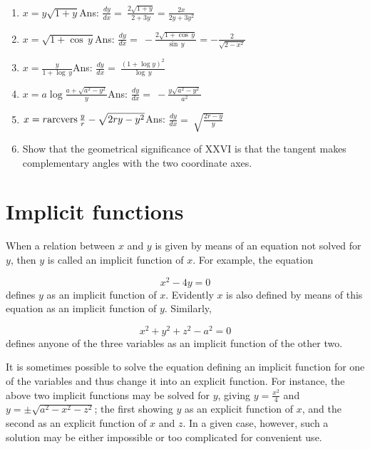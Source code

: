 \begin{enumerate}
\addtocounter{enumi}{43}
\item
$x = y\sqrt{1 + y}$\qquad\qquad\qquad\qquad\qquad\qquad Ans:  	
$\frac{dy}{dx} 	=\ \frac{2\sqrt{1 + y}}{2 + 3y} = \frac{2x}{2y + 3y^2}$

\item
$x = \sqrt{1 + \cos\, y}$\qquad\qquad\qquad\qquad\qquad\qquad Ans:  	
$\frac{dy}{dx} 	=\ -\frac{2 \sqrt{1 + \cos\, y}}{\sin\, y} = -\frac{2}{\sqrt{2 - x^2}}$

\item
$x = \frac{y}{1 + \log\, y}$\qquad\qquad\qquad\qquad\qquad\qquad Ans:  	
$\frac{dy}{dx} 	=\ \frac{(1 + \log y)^2}{\log\, y}$

\item
$x = a \log \frac{a + \sqrt{a^2 - y^2}}{y}$\qquad\qquad\qquad\qquad\qquad\qquad Ans:  
$\frac{dy}{dx} 	=\ -\frac{y \sqrt{a^2 - y^2}}{a^2}$

\item
$x = r {\rm arcvers}\, \frac{y}{r} - \sqrt{2ry - y^2}$\qquad\qquad\qquad\qquad\qquad\qquad Ans:  
$\frac{dy}{dx} 	=\ \sqrt{\frac{2r - y}{y}}$

\item
Show that the geometrical significance of XXVI is 
that the tangent makes complementary angles with the two coordinate axes.


\end{enumerate}

\section{Implicit functions}

When a relation between $x$ and $y$ is given by means of an equation 
not solved for $y$, then $y$ is called an implicit function of $x$. 
For example, the equation

\[
    x^2 - 4y = 0
\]
defines $y$ as an implicit function of $x$. Evidently $x$ is also defined 
by means of this equation as an implicit function of $y$. Similarly,

\[
    x^2 + y^2 + z^2 - a^2 = 0
\]
defines anyone of the three variables as an implicit function of the other two.

It is sometimes possible to solve the equation defining an implicit 
function for one of the variables and thus change it into an explicit 
function. For instance, the above two implicit functions may be solved for $y$, 
giving $y 	= \frac{x^2}{4}$
and $ y 	= \pm \sqrt{a^2 - x^2 - z^2}$;
the first showing $y$ as an explicit function of $x$, and the second as 
an explicit function of $x$ and $z$. In a given case, however, 
such a solution may be either impossible or too complicated for convenient use.

